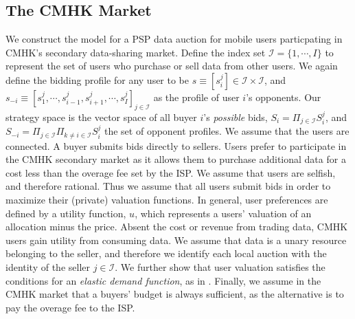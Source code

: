 \documentclass[sigconf, anonymous]{acmart}
\newcommand{\mcI}{\mathcal{I}}
\theoremstyle{definition}
\begin{document}
\subsection{The CMHK Market}

We construct the model for a PSP data auction for mobile users
particpating in CMHK's secondary data-sharing market.
Define the index set $\mcI = \lbrace 1, \cdots, I\rbrace$ to represent the set of users who purchase or sell
data from other users. We again define the bidding profile for any user to be 
$s \equiv
[s_i^j] \in \mcI \times \mcI$, and $s_{-i} \equiv [s_1^j , \cdots , s_{i-1}^j , s_{i+1}^j , \cdots
, s_I^j]_{j\in\mcI}$ as the profile of user $i$'s opponents. 
Our strategy space is the vector space of all buyer $i$'s \emph{possible} bids,
$S_i=\Pi_{j\in\mcI} S_i^j$, and $S_{-i} =\Pi_{j\in\mcI} \Pi_{k\ne i\in\mcI} S_i^j$ the
set of opponent profiles. We assume that the users are connected.
A buyer submits bids directly to sellers. Users prefer to participate in the CMHK secondary market as it allows them to purchase
additional data for a cost less than the overage fee set by the ISP. We assume
that users are selfish, and therefore rational. 
Thus we assume that all users submit bids in order to maximize their
(private) valuation functions. 
In general, user preferences are defined by a utility function, $u$, which 
represents a users' valuation of an allocation minus the price.
Absent the cost or revenue from trading data, CMHK users gain utility from consuming
data. 
We assume that data is a unary resource belonging to the seller, and
therefore we identify each local auction with the identity of the seller
$j\in\mcI$.
We further show that user valuation satisfies the conditions for an
\emph{elastic demand function}, as in \cite{lazar}.
Finally, we assume in the CMHK market that a buyers' budget is always
sufficient, as the alternative is to pay the overage fee to the ISP.
\end{document}
